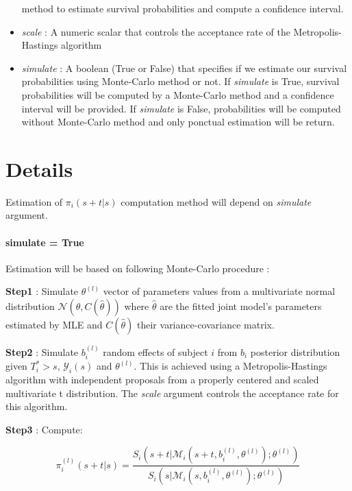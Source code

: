 \documentclass[11pt, oneside]{article}   	%
\begin{document}
\begin{itemize}
  method to estimate survival probabilities and compute a confidence
  interval.
\item
  \emph{scale} : A numeric scalar that controls the acceptance rate of
  the Metropolis-Hastings algorithm
\item
  \emph{simulate} : A boolean (True or False) that specifies if we
  estimate our survival probabilities using Monte-Carlo method or not.
  If \emph{simulate} is True, survival probabilities will be computed by
  a Monte-Carlo method and a confidence interval will be provided. If
  \emph{simulate} is False, probabilities will be computed without
  Monte-Carlo method and only ponctual estimation will be return.
\end{itemize}









\section{Details}\label{details}

Estimation of \(\pi_i(s+t | s)\) computation method will depend on \emph{simulate} argument.

\paragraph{simulate = True}\label{simulate-true}

Estimation will be based on following Monte-Carlo procedure :

\textbf{Step1} : Simulate \(\theta^{(l)}\) vector of parameters values from a
multivariate normal distribution \(\mathcal{N}(\hat{\theta}, C(\hat{\theta}))\) 
where \(\hat{\theta}\) are the fitted joint model's parameters estimated by
MLE and \(C(\hat{\theta})\) their variance-covariance matrix.

\textbf{Step2} : Simulate \(b_i^{(l)}\) random effects of subject \(i\)
from \(b_i\) posterior distribution given \(T_i^* > s\),
\(\mathcal{Y}_i(s)\) and \(\theta^{(l)}\). This is achieved using a
Metropolis-Hastings algorithm with independent proposals from a properly
centered and scaled multivariate t distribution. The \emph{scale}
argument controls the acceptance rate for this algorithm.

\textbf{Step3} : Compute:

\[
\pi_i^{(l)}(s+t | s) = \frac
    {S_i(s+t | \mathcal{M}_i(s+t, b_i^{(l)}, \theta^{(l)}); \theta^{(l)})}
    {S_i(s | \mathcal{M}_i(s, b_i^{(l)}, \theta^{(l)}); \theta^{(l)})}
\]
\end{document}
